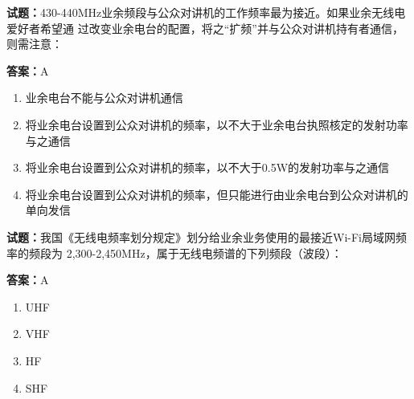 \documentclass{ctexbook}
\begin{document}




\vspace{1em}

\textbf{试题：}430-440MHz业余频段与公众对讲机的工作频率最为接近。如果业余无线电爱好者希望通
过改变业余电台的配置，将之“扩频”并与公众对讲机持有者通信，则需注意： 


\textbf{答案：}A 

\begin{enumerate}[leftmargin=3em]
  \item 业余电台不能与公众对讲机通信 

  \item 将业余电台设置到公众对讲机的频率，以不大于业余电台执照核定的发射功率与之通信 

  \item 将业余电台设置到公众对讲机的频率，以不大于0.5W的发射功率与之通信 

  \item 将业余电台设置到公众对讲机的频率，但只能进行由业余电台到公众对讲机的单向发信 

\end{enumerate}





\vspace{1em}

\textbf{试题：}我国《无线电频率划分规定》划分给业余业务使用的最接近Wi-Fi局域网频率的频段为
2,300-2,450MHz，属于无线电频谱的下列频段（波段）： 

\textbf{答案：}A 

\begin{enumerate}[leftmargin=3em]
  \item UHF 

  \item VHF 

  \item HF 

  \item SHF 

\end{enumerate}





\vspace{1em}
\end{document}
